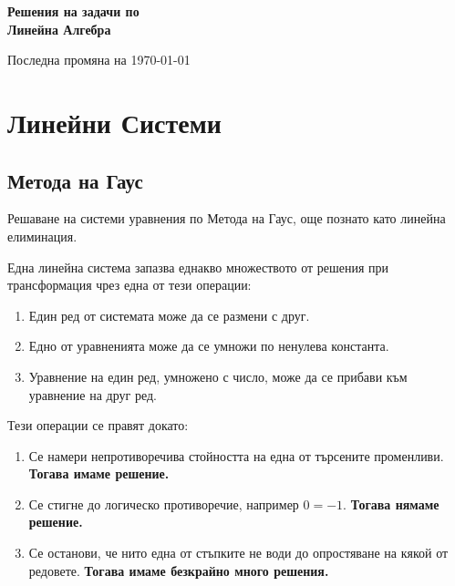 \documentclass[12pt]{article}
\begin{document}
\begin{titlepage}
    \begin{center}
        \huge
        \textbf{Решения на задачи по \\ Линейна Алгебра}

        \large \vfill
        Последна промяна на \today
    \end{center}
\end{titlepage}
\newpage

\tableofcontents
\newpage

\section{Линейни Системи}

\subsection{Метода на Гаус}

\noindent Решаване на системи уравнения по Метода на Гаус, още познато като линейна елиминация.

\noindent Една линейна система запазва еднакво множеството от решения при трансформация чрез една от тези операции:
\begin{enumerate}
    \item Един ред от системата може да се размени с друг.
    \item Едно от уравненията може да се умножи по ненулева константа.
    \item Уравнение на един ред, умножено с число, може да се прибави към уравнение на друг ред.
\end{enumerate}

\noindent Тези операции се правят докато:
\begin{enumerate}
    \item Се намери непротиворечива стойността на една от търсените променливи. \textbf{Тогава имаме решение.}
    \item Се стигне до логическо противоречие, например $0=-1$. \textbf{Тогава нямаме решение.}
    \item Се останови, че нито една от стъпките не води до опростяване на кякой от редовете. \textbf{Тогава имаме безкрайно много решения.}
\end{enumerate}









\end{document}

